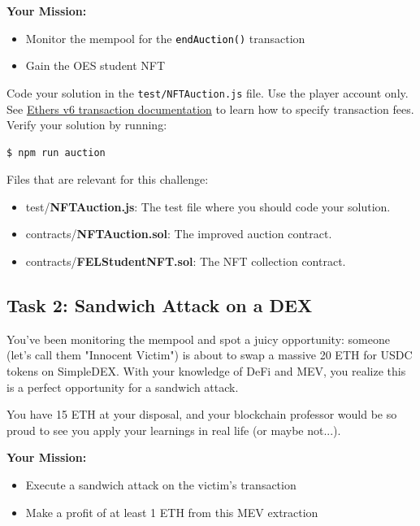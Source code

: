\documentclass[12pt]{article}
\newcommand{\codegrey}[1]{%
  \texttt{\colorbox{black!4}{\textcolor{black}{#1}}}%
}
\begin{document}
\medskip
\noindent
\textbf{Your Mission:}
\begin{itemize}
    \item Monitor the mempool for the \codegrey{endAuction()} transaction
    \item Gain the OES student NFT
\end{itemize}

\noindent
Code your solution in the \texttt{test/NFTAuction.js} file. Use the player account only. See \href{https://docs.ethers.org/v6/api/transaction/\#Transaction}{Ethers v6 transaction documentation} to learn how to specify transaction fees. Verify your solution by running:

\begin{verbatim}
$ npm run auction
\end{verbatim}

\noindent
Files that are relevant for this challenge:
\begin{itemize}
\item test/\textbf{NFTAuction.js}: The test file where you should code your solution.
\item contracts/\textbf{NFTAuction.sol}: The improved auction contract.
\item contracts/\textbf{FELStudentNFT.sol}: The NFT collection contract.
\end{itemize}

\subsection*{Task 2: Sandwich Attack on a DEX}

You've been monitoring the mempool and spot a juicy opportunity: someone (let's call them "Innocent Victim") is about to swap a massive 20 ETH for USDC tokens on SimpleDEX. With your knowledge of DeFi and MEV, you realize this is a perfect opportunity for a sandwich attack.

You have 15 ETH at your disposal, and your blockchain professor would be so proud to see you apply your learnings in real life (or maybe not...).

\medskip
\noindent
\textbf{Your Mission:}
\begin{itemize}
  \item Execute a sandwich attack on the victim's transaction
  \item Make a profit of at least 1 ETH from this MEV extraction
\end{itemize}
\end{document}
